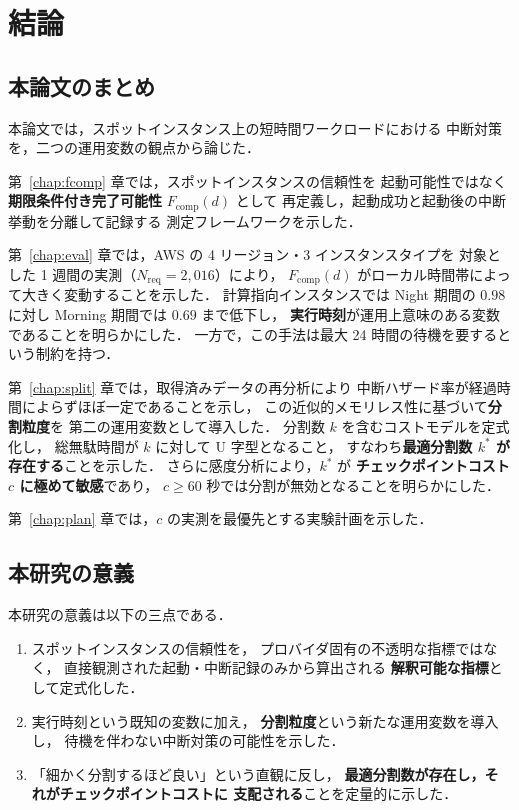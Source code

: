 \documentclass[11pt,a4paper]{ltjsreport}
\newcommand{\Fcomp}{F_{\mathrm{comp}}}
\newcommand{\Nreq}{N_{\mathrm{req}}}
\begin{document}
\chapter{結論}

\section{本論文のまとめ}

本論文では，スポットインスタンス上の短時間ワークロードにおける
中断対策を，二つの運用変数の観点から論じた．

第~\ref{chap:fcomp} 章では，スポットインスタンスの信頼性を
起動可能性ではなく\textbf{期限条件付き完了可能性} $\Fcomp(d)$ として
再定義し，起動成功と起動後の中断挙動を分離して記録する
測定フレームワークを示した．

第~\ref{chap:eval} 章では，AWS の 4 リージョン・3 インスタンスタイプを
対象とした 1 週間の実測（$\Nreq = 2{,}016$）により，
$\Fcomp(d)$ がローカル時間帯によって大きく変動することを示した．
計算指向インスタンスでは Night 期間の $0.98$ に対し
Morning 期間では $0.69$ まで低下し，
\textbf{実行時刻}が運用上意味のある変数であることを明らかにした．
一方で，この手法は最大 24 時間の待機を要するという制約を持つ．

第~\ref{chap:split} 章では，取得済みデータの再分析により
中断ハザード率が経過時間によらずほぼ一定であることを示し，
この近似的メモリレス性に基づいて\textbf{分割粒度}を
第二の運用変数として導入した．
分割数 $k$ を含むコストモデルを定式化し，
総無駄時間が $k$ に対して U 字型となること，
すなわち\textbf{最適分割数 $k^{*}$ が存在する}ことを示した．
さらに感度分析により，$k^{*}$ が
\textbf{チェックポイントコスト $c$ に極めて敏感}であり，
$c \geq 60$ 秒では分割が無効となることを明らかにした．

第~\ref{chap:plan} 章では，$c$ の実測を最優先とする実験計画を示した．

\section{本研究の意義}

本研究の意義は以下の三点である．

\begin{enumerate}
  \item スポットインスタンスの信頼性を，
        プロバイダ固有の不透明な指標ではなく，
        直接観測された起動・中断記録のみから算出される
        \textbf{解釈可能な指標}として定式化した．
  \item 実行時刻という既知の変数に加え，
        \textbf{分割粒度}という新たな運用変数を導入し，
        待機を伴わない中断対策の可能性を示した．
  \item 「細かく分割するほど良い」という直観に反し，
        \textbf{最適分割数が存在し，それがチェックポイントコストに
        支配される}ことを定量的に示した．
\end{enumerate}
\end{document}
